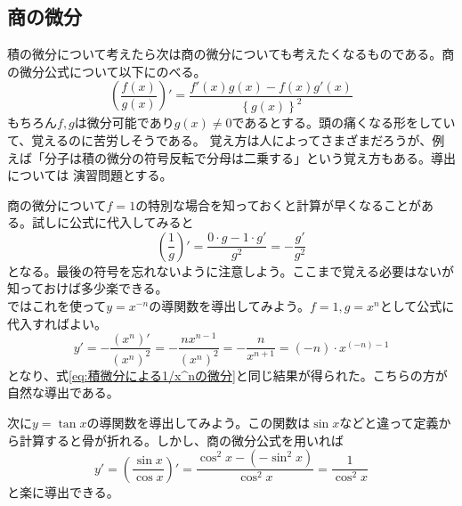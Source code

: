 \documentclass[a4j,dvipdfmx]{jsarticle}
\begin{document}
            \subsection{商の微分}
                積の微分について考えたら次は商の微分についても考えたくなるものである。商の微分公式について以下にのべる。
                \begin{equation}
                    \left(\frac{f(x)}{g(x)}\right)'=\frac{f'(x)g(x)-f(x)g'(x)}{\left\{g(x)\right\}^2}\label{eq:商の微分公式}
                \end{equation}
                もちろん$f,g$は微分可能であり$g(x)\neq 0$であるとする。頭の痛くなる形をしていて、覚えるのに苦労しそうである。
                覚え方は人によってさまざまだろうが、例えば「分子は積の微分の符号反転で分母は二乗する」という覚え方もある。導出については
                演習問題とする。

                商の微分について$f=1$の特別な場合を知っておくと計算が早くなることがある。試しに公式に代入してみると
                \begin{equation}
                    \left(\frac{1}{g}\right)'=\frac{0\cdot g-1\cdot g'}{g^2}=-\frac{g'}{g^2}
                \end{equation}
                となる。最後の符号を忘れないように注意しよう。ここまで覚える必要はないが知っておけば多少楽できる。\\

                ではこれを使って$y=x^{-n}$の導関数を導出してみよう。$f=1,g=x^n$として公式に代入すればよい。
                \begin{equation}
                    y'=-\frac{(x^n)'}{(x^n)^2}=-\frac{nx^{n-1}}{(x^n)^2}=-\frac{n}{x^{n+1}}=(-n)\cdot x^{(-n)-1}
                \end{equation}
                となり、式\eqref{eq:積微分による1/x^nの微分}と同じ結果が得られた。こちらの方が自然な導出である。

                次に$y=\tan x$の導関数を導出してみよう。この関数は$\sin x$などと違って定義から計算すると骨が折れる。しかし、商の微分公式を用いれば
                \begin{equation}
                    y'=\left(\frac{\sin x}{\cos x}\right)'=\frac{\cos^2 x-(-\sin^2 x)}{\cos^2 x}=\frac{1}{\cos^2 x}
                \end{equation}
                と楽に導出できる。
            \clearpage
\end{document}
